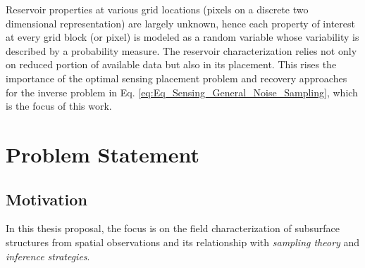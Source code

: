 Reservoir properties at various grid locations (pixels on a discrete two dimensional representation) are largely unknown, hence each property of interest at every grid block (or pixel) is modeled as a random variable whose variability is described by a probability measure. The reservoir characterization relies not only on reduced portion of available data but also in its placement. This rises the importance of the optimal sensing placement problem and recovery approaches for the inverse problem in Eq. \eqref{eq:Eq_Sensing_General_Noise_Sampling}, which is the focus of this work.



































































\section{Problem Statement}

\subsection{Motivation}

In this thesis proposal, the focus is on the field characterization of subsurface structures from spatial observations and its relationship with \emph{sampling theory} and \emph{inference strategies}. 

